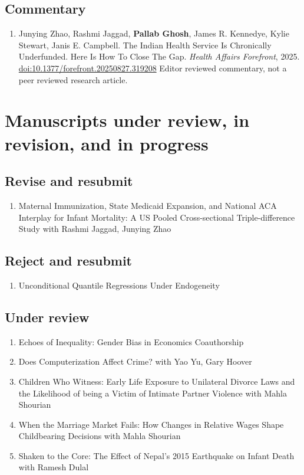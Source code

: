 \documentclass[10.5pt]{article}
\begin{document}
\subsection{Commentary}
\begin{enumerate}[start=22]
\item Junying Zhao, Rashmi Jaggad, \textbf{Pallab Ghosh}, James R. Kennedye, Kylie Stewart, Janis E. Campbell. The Indian Health Service Is Chronically Underfunded. Here Is How To Close The Gap. \emph{Health Affairs Forefront}, 2025. \href{https://doi.org/10.1377/forefront.20250827.319208}{doi:10.1377/forefront.20250827.319208} {\footnotesize Editor reviewed commentary, not a peer reviewed research article.}
\end{enumerate}
\section{Manuscripts under review, in revision, and in progress}
\subsection{Revise and resubmit}
\begin{enumerate}
\item Maternal Immunization, State Medicaid Expansion, and National ACA Interplay for Infant Mortality: A US Pooled Cross-sectional Triple-difference Study with Rashmi Jaggad, Junying Zhao
\end{enumerate}
\subsection{Reject and resubmit}
\begin{enumerate}
\item Unconditional Quantile Regressions Under Endogeneity
\end{enumerate}
\subsection{Under review}
\begin{enumerate}
\item Echoes of Inequality: Gender Bias in Economics Coauthorship
\item Does Computerization Affect Crime? with Yao Yu, Gary Hoover
\item Children Who Witness: Early Life Exposure to Unilateral Divorce Laws and the Likelihood of being a Victim of Intimate Partner Violence with Mahla Shourian
\item When the Marriage Market Fails: How Changes in Relative Wages Shape Childbearing Decisions with Mahla Shourian
\item Shaken to the Core: The Effect of Nepal's 2015 Earthquake on Infant Death with Ramesh Dulal
\end{enumerate}
\end{document}
